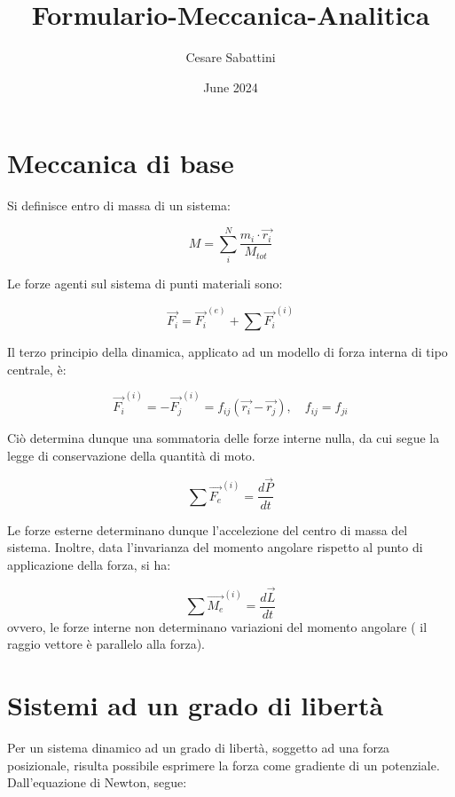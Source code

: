 \documentclass{article}
\title{Formulario-Meccanica-Analitica}
\author{Cesare Sabattini}
\date{June 2024}
\begin{document}
\maketitle

\section{Meccanica di base}

Si definisce entro di massa di un sistema:

\begin{equation}
    M= \sum_i^N \frac{m_i\cdot \vec{r_i}}{
        M_{tot}
    }
\end{equation}

Le forze agenti sul sistema di punti materiali sono:

\begin{equation}
    \vec{F_i}=\vec{F_i}^{(e)}+\sum\vec{F_i}^{(i)}
\end{equation}

Il terzo principio della dinamica, applicato ad un modello di forza interna di tipo centrale, è:

\begin{equation}
    \vec{F_i}^{(i)}=-\vec{F_j}^{(i)}=f_{ij}(\vec{r_i}-\vec{r_j}), \quad f_{ij}=f_{ji}
\end{equation}

Ciò determina dunque una sommatoria delle forze interne nulla, da cui segue la legge di conservazione della quantità di moto.

\begin{equation}
    \sum \vec{F_e}^{(i)}= \frac{d\vec{P}}{dt}
\end{equation}

Le forze esterne determinano dunque l'accelezione del centro di massa del sistema.
Inoltre, data l'invarianza del momento angolare rispetto al punto di applicazione della forza, si ha:

\begin{equation}
    \sum \vec{M_e}^{(i)}= \frac{d\vec{L}}{dt}
\end{equation}
ovvero, le forze interne non determinano variazioni del momento angolare ( il raggio vettore è parallelo alla forza).



\section{Sistemi ad un grado di libertà}
Per un sistema dinamico ad un grado di libertà, soggetto ad una forza posizionale, risulta possibile esprimere la forza come gradiente di un potenziale.
Dall'equazione di Newton, segue:
\end{document}
